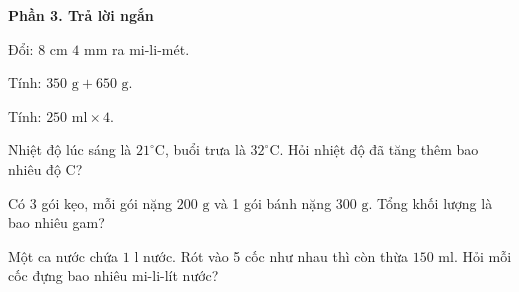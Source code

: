 \textbf{Phần 3. Trả lời ngắn}

\begin{ex} %
Đổi: $8\text{ cm } 4\text{ mm}$ ra mi-li-mét.
\end{ex}

\begin{ex} %
Tính: $350\text{ g} + 650\text{ g}$.
\end{ex}

\begin{ex} %
Tính: $250\text{ ml} \times 4$.
\end{ex}

\begin{ex} %
Nhiệt độ lúc sáng là $21^\circ\text{C}$, buổi trưa là $32^\circ\text{C}$. Hỏi nhiệt độ đã tăng thêm bao nhiêu độ C?
\end{ex}

\begin{ex} %
Có 3 gói kẹo, mỗi gói nặng $200\text{ g}$ và 1 gói bánh nặng $300\text{ g}$. Tổng khối lượng là bao nhiêu gam?
\end{ex}

\begin{ex} %
Một ca nước chứa $1\text{ l}$ nước. Rót vào 5 cốc như nhau thì còn thừa $150\text{ ml}$. Hỏi mỗi cốc đựng bao nhiêu mi-li-lít nước?
\end{ex}
